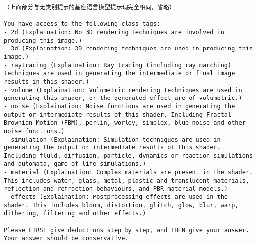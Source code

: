 \begin{lstlisting}[style=plaintext, caption={有简单类别提示的基座语言模型提示词}, label=lst:simplePromptPrompt]
（上面部分与无类别提示的基座语言模型提示词完全相同，省略）

You have access to the following class tags:
- 2d (Explaination: No 3D rendering techniques are involved in producing this image.)
- 3d (Explaination: 3D rendering techniques are used in producing this image.)
- raytracing (Explaination: Ray tracing (including ray marching) techniques are used in generating the intermediate or final image results in this shader.)
- volume (Explaination: Volumetric rendering techniques are used in generating this shader, or the generated effect are of volumetric.)
- noise (Explaination: Noise functions are used in generating the output or intermediate results of this shader. Including Fractal Brownian Motion (FBM), perlin, worley, simplex, blue noise and other noise functions.)
- simulation (Explaination: Simulation techniques are used in generating the output or intermediate results of this shader. Including fluld, diffusion, particle, dynamics or reaction simulations and automata, game-of-life simulations.)
- material (Explaination: Complex materials are present in the shader. This includes water, glass, metal, plastic and translucent materials, reflection and refraction behaviours, and PBR material models.)
- effects (Explaination: Postprocessing effects are used in the shader. This includes bloom, distortion, glitch, glow, blur, warp, dithering, filtering and other effects.)

Please FIRST give deductions step by step, and THEN give your answer. Your answer should be conservative.
\end{lstlisting}

